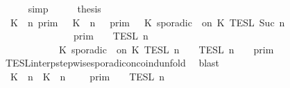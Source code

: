 \begin{isabellebody}
\ \ \ \ \isamarkupfalse%
\ simp\isanewline
\ \ \isamarkupfalse%
\ \isamarkupfalse%
\ {\isacharquery}thesis\isanewline
\ \ \isamarkupfalse%
\ {\isacharminus}\isanewline
\ \ \ \ \isamarkupfalse%
\ {\isacartoucheopen}{\isacharparenleft}{\isasymlbrakk}\ K\ {\isasymUp}\ n\ {\isasymrbrakk}\isactrlsub p\isactrlsub r\isactrlsub i\isactrlsub m\ {\isasyminter}\ {\isasymlbrakk}\ K\ {\isasymDown}\ n\ {\isacharat}\ {\isasymtau}\ {\isasymrbrakk}\isactrlsub p\isactrlsub r\isactrlsub i\isactrlsub m\ {\isasymunion}\ {\isasymlbrakk}\ K\ sporadic\ {\isasymtau}\ on\ K\ {\isasymrbrakk}\isactrlsub T\isactrlsub E\isactrlsub S\isactrlsub L\isactrlbsup {\isasymge}\ Suc\ n\isactrlesup {\isacharparenright}\isanewline
\ \ \ \ \ \ \ \ \ \ \ \ {\isasyminter}\ {\isacharparenleft}{\isasymlbrakk}{\isasymlbrakk}\ {\isasymGamma}\ {\isasymrbrakk}{\isasymrbrakk}\isactrlsub p\isactrlsub r\isactrlsub i\isactrlsub m\ {\isasyminter}\ {\isasymlbrakk}{\isasymlbrakk}\ {\isasymPsi}\ {\isasymrbrakk}{\isasymrbrakk}\isactrlsub T\isactrlsub E\isactrlsub S\isactrlsub L\isactrlbsup {\isasymge}\ n\isactrlesup {\isacharparenright}\isanewline
\ \ \ \ \ \ \ \ \ \ {\isacharequal}\ {\isasymlbrakk}\ K\ sporadic\ {\isasymtau}\ on\ K\ {\isasymrbrakk}\isactrlsub T\isactrlsub E\isactrlsub S\isactrlsub L\isactrlbsup {\isasymge}\ n\isactrlesup \ {\isasyminter}\ {\isacharparenleft}{\isasymlbrakk}{\isasymlbrakk}\ {\isasymPsi}\ {\isasymrbrakk}{\isasymrbrakk}\isactrlsub T\isactrlsub E\isactrlsub S\isactrlsub L\isactrlbsup {\isasymge}\ n\isactrlesup \ {\isasyminter}\ {\isasymlbrakk}{\isasymlbrakk}\ {\isasymGamma}\ {\isasymrbrakk}{\isasymrbrakk}\isactrlsub p\isactrlsub r\isactrlsub i\isactrlsub m{\isacharparenright}{\isacartoucheclose}\isanewline
\ \ \ \ \ \ \isamarkupfalse%
\ TESL{\isacharunderscore}interp{\isacharunderscore}stepwise{\isacharunderscore}sporadicon{\isacharunderscore}coind{\isacharunderscore}unfold\ \isamarkupfalse%
\ blast\isanewline
\ \ \ \ \isamarkupfalse%
\ {\isacartoucheopen}{\isasymlbrakk}{\isasymlbrakk}\ {\isacharparenleft}{\isacharparenleft}K\ {\isasymUp}\ n{\isacharparenright}\ {\isacharhash}\ {\isacharparenleft}K\ {\isasymDown}\ n\ {\isacharat}\ {\isasymtau}{\isacharparenright}\ {\isacharhash}\ {\isasymGamma}{\isacharparenright}\ {\isasymrbrakk}{\isasymrbrakk}\isactrlsub p\isactrlsub r\isactrlsub i\isactrlsub m\ {\isasyminter}\ {\isasymlbrakk}{\isasymlbrakk}\ {\isasymPsi}\ {\isasymrbrakk}{\isasymrbrakk}\isactrlsub T\isactrlsub E\isactrlsub S\isactrlsub L\isactrlbsup {\isasymge}\ n\isactrlesup \isanewline

\end{isabellebody}

